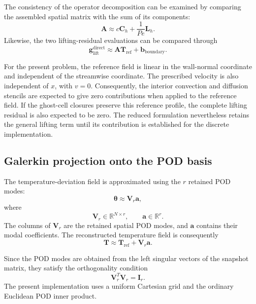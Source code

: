 The consistency of the operator decomposition can be
examined by comparing the assembled spatial matrix with
the sum of its components:
\begin{equation}
    \boxed{
    \mathbf{A}
    \approx
    c\mathbf{C}_h+\frac{1}{Pe}\mathbf{L}_h.
    }
    \label{eq:operator_verification}
\end{equation}
Likewise, the two lifting-residual evaluations can be
compared through
\begin{equation}
    \boxed{
    \mathbf{g}_{\mathrm{lift}}^{\mathrm{direct}}
    \approx
    \mathbf{A}\mathbf{T}_{\mathrm{ref}}
    +\mathbf{b}_{\mathrm{boundary}}.
    }
    \label{eq:lifting_verification}
\end{equation}

For the present problem, the reference field is linear
in the wall-normal coordinate and independent of the
streamwise coordinate. The prescribed velocity is also
independent of $x$, with $v=0$. Consequently, the interior
convection and diffusion stencils are expected to give
zero contributions when applied to the reference field.
If the ghost-cell closures preserve this reference
profile, the complete lifting residual is also expected
to be zero. The reduced formulation nevertheless retains
the general lifting term until its contribution is
established for the discrete implementation.

\subsection{Galerkin projection onto the POD basis}

The temperature-deviation field is approximated using the
$r$ retained POD modes:
\begin{equation}
    \boxed{
    \boldsymbol{\theta}\approx\mathbf{V}_r\mathbf{a},
    }
    \label{eq:rom_approximation}
\end{equation}
where
\[
\mathbf{V}_r\in\mathbb{R}^{N\times r},
\qquad
\mathbf{a}\in\mathbb{R}^{r}.
\]
The columns of $\mathbf{V}_r$ are the retained spatial POD
modes, and $\mathbf{a}$ contains their modal coefficients.
The reconstructed temperature field is consequently
\[
\mathbf{T}\approx
\mathbf{T}_{\mathrm{ref}}+\mathbf{V}_r\mathbf{a}.
\]

Since the POD modes are obtained from the left singular
vectors of the snapshot matrix, they satisfy the
orthogonality condition
\begin{equation}
    \boxed{
    \mathbf{V}_r^T\mathbf{V}_r=\mathbf{I}_r.
    }
    \label{eq:pod_orthogonality}
\end{equation}
The present implementation uses a uniform Cartesian grid
and the ordinary Euclidean POD inner product.

